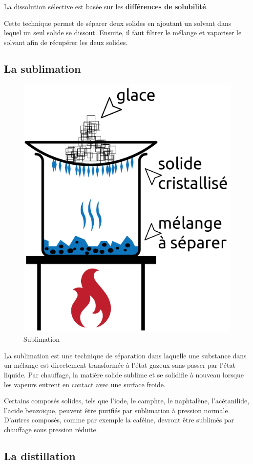 \documentclass[
  11pt,
  french,
  a4paper,
  openany]{book}
\begin{document}

La dissolution sélective est basée sur les \textbf{différences de solubilité}.

Cette technique permet de séparer deux solides en ajoutant un solvant dans lequel un seul solide se dissout. Ensuite, il faut filtrer le mélange et vaporiser le solvant afin de récupérer les deux solides.

\newpage

\hypertarget{la-sublimation}{%
\subsection{La sublimation}\label{la-sublimation}}

\begin{figure}

{\centering \includegraphics[width=0.28\linewidth]{images/sublimation} 

}

\caption{Sublimation}\label{fig:sublimation}
\end{figure}

La sublimation est une technique de séparation dans laquelle une substance dans un mélange est directement transformée à l'état gazeux sans passer par l'état liquide. Par chauffage, la matière solide sublime et se solidifie à nouveau lorsque les vapeurs entrent en contact avec une surface froide.

Certains composés solides, tels que l'iode, le camphre, le naphtalène, l'acétanilide, l'acide benzoïque, peuvent être purifiés par sublimation à pression normale. D'autres composés, comme par exemple la caféine, devront être sublimés par chauffage sous pression réduite.

\hypertarget{la-distillation}{%
\subsection{La distillation}\label{la-distillation}}
\end{document}

